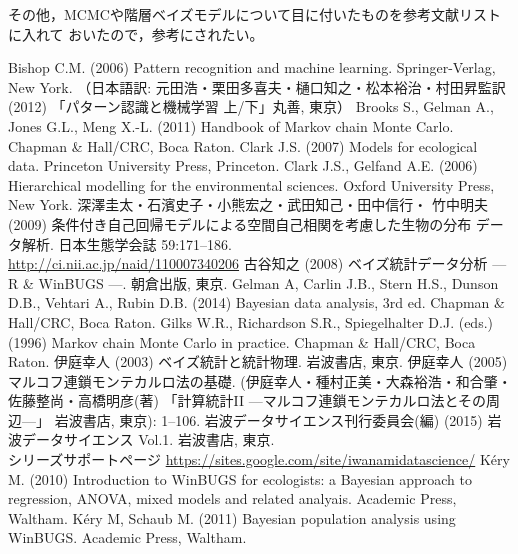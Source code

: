 \documentclass[11pt,uplatex]{jsarticle}
\begin{document}
その他，MCMCや階層ベイズモデルについて目に付いたものを参考文献リストに入れて
おいたので，参考にされたい。


\begin{thebibliography}{99}
 Bishop C.M. (2006) Pattern recognition and machine learning.
  Springer-Verlag, New York.
  （日本語訳: 元田浩・栗田多喜夫・樋口知之・松本裕治・村田昇監訳 (2012)
  「パターン認識と機械学習 上/下」丸善, 東京）
 Brooks S., Gelman A., Jones G.L., Meng X.-L. (2011)
Handbook of Markov chain Monte Carlo. Chapman \& Hall/CRC, Boca Raton. 
 Clark J.S. (2007) Models for ecological data.
  Princeton University Press, Princeton.
 Clark J.S., Gelfand A.E. (2006) Hierarchical modelling
  for the environmental sciences. Oxford University Press, New York.
 深澤圭太・石濱史子・小熊宏之・武田知己・田中信行・
  竹中明夫 (2009) 条件付き自己回帰モデルによる空間自己相関を考慮した生物の分布
  データ解析. 日本生態学会誌 59:171--186. \\
  \url{http://ci.nii.ac.jp/naid/110007340206}
 古谷知之 (2008) ベイズ統計データ分析 --- R \& WinBUGS ---.
  朝倉出版, 東京.
 Gelman A, Carlin J.B., Stern H.S., Dunson D.B., Vehtari A.,
  Rubin D.B. (2014) Bayesian data analysis, 3rd ed.
  Chapman \& Hall/CRC, Boca Raton.
 Gilks W.R., Richardson S.R., Spiegelhalter D.J. (eds.) (1996)
  Markov chain Monte Carlo in practice. Chapman \& Hall/CRC, Boca Raton.
 伊庭幸人 (2003) ベイズ統計と統計物理. 岩波書店, 東京.
 伊庭幸人 (2005) マルコフ連鎖モンテカルロ法の基礎. 
  (伊庭幸人・種村正美・大森裕浩・和合肇・佐藤整尚・高橋明彦(著)
  「計算統計II ---マルコフ連鎖モンテカルロ法とその周辺---」
  岩波書店, 東京): 1--106.
 岩波データサイエンス刊行委員会(編) (2015) 岩波データサイエンス Vol.1.
岩波書店, 東京. \\
シリーズサポートページ \url{https://sites.google.com/site/iwanamidatascience/}
 K\'ery M. (2010) Introduction to WinBUGS for ecologists:
  a Bayesian approach to regression, ANOVA, mixed models and related analyais.
  Academic Press, Waltham.
 K\'ery M, Schaub M. (2011) Bayesian population analysis using WinBUGS.
  Academic Press, Waltham.

\end{thebibliography}
\end{document}
